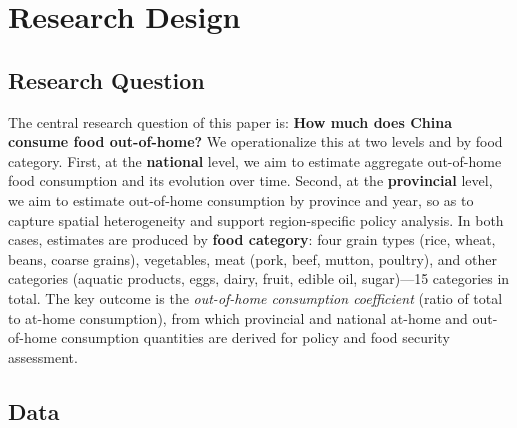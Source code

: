 
\section{Research Design}
\label{sec:research-design}

\subsection{Research Question}
\label{subsec:research-question}

The central research question of this paper is: \textbf{How much does China consume food out-of-home?} We operationalize this at two levels and by food category. First, at the \textbf{national} level, we aim to estimate aggregate out-of-home food consumption and its evolution over time. Second, at the \textbf{provincial} level, we aim to estimate out-of-home consumption by province and year, so as to capture spatial heterogeneity and support region-specific policy analysis. In both cases, estimates are produced by \textbf{food category}: four grain types (rice, wheat, beans, coarse grains), vegetables, meat (pork, beef, mutton, poultry), and other categories (aquatic products, eggs, dairy, fruit, edible oil, sugar)---15 categories in total. The key outcome is the \emph{out-of-home consumption coefficient} (ratio of total to at-home consumption), from which provincial and national at-home and out-of-home consumption quantities are derived for policy and food security assessment.

\subsection{Data}
\label{subsec:data}

